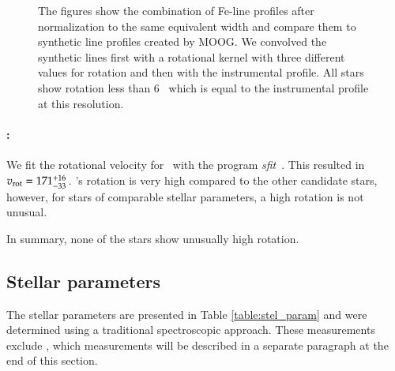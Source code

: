 \begin{figure}[h!]
\begin{tabular}{cc}
\end{tabular}
\caption{ The figures show the combination of Fe-line profiles after normalization to the same equivalent width and compare them to synthetic line profiles created by MOOG. We convolved the synthetic lines first with a rotational kernel with three different values for rotation and then with the instrumental profile. All stars show rotation less than 6 \kms\ which is equal to the instrumental profile at this resolution. }
\label{fig:rotvel}
\end{figure}

\paragraph{\starb:}
We fit the rotational velocity for \starb\ with the program \textit{sfit}\ \citep[][described in section \ref{sec:stellar-parameters}]{2001A&A...376..497J}.  This resulted in $v_{\rm rot}=171^{+16}_{-33}$\,\kms. \starb's rotation is very high compared to the other candidate stars, however, for stars  of comparable stellar parameters, a high rotation is not unusual.


In summary, none of the stars show unusually high rotation.





\subsection{Stellar parameters}
\label{sec:stellar-parameters}
The stellar parameters are presented in Table \ref{table:stel_param} and were determined using a traditional spectroscopic approach. These measurements exclude \starb, which measurements will be described in a separate paragraph at the end of this section. 

